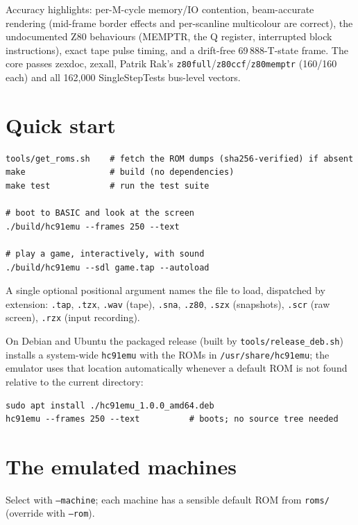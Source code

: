 \documentclass[11pt,a4paper]{article}
\newcommand{\opt}[1]{\texttt{#1}}
\begin{document}
Accuracy highlights: per-M-cycle memory/IO contention, beam-accurate
rendering (mid-frame border effects and per-scanline multicolour are
correct), the undocumented Z80 behaviours (MEMPTR, the Q register,
interrupted block instructions), exact tape pulse timing, and a
drift-free 69\,888-T-state frame. The core passes zexdoc, zexall,
Patrik Rak's \texttt{z80full}/\texttt{z80ccf}/\texttt{z80memptr}
(160/160 each) and all 162{,}000 SingleStepTests bus-level vectors.

\section{Quick start}

\begin{Verbatim}
tools/get_roms.sh    # fetch the ROM dumps (sha256-verified) if absent
make                 # build (no dependencies)
make test            # run the test suite

# boot to BASIC and look at the screen
./build/hc91emu --frames 250 --text

# play a game, interactively, with sound
./build/hc91emu --sdl game.tap --autoload
\end{Verbatim}

A single optional positional argument names the file to load,
dispatched by extension: \texttt{.tap}, \texttt{.tzx}, \texttt{.wav}
(tape),
\texttt{.sna}, \texttt{.z80}, \texttt{.szx} (snapshots),
\texttt{.scr} (raw screen), \texttt{.rzx} (input recording).

On Debian and Ubuntu the packaged release (built by
\texttt{tools/release\_deb.sh}) installs a system-wide
\texttt{hc91emu} with the ROMs in \texttt{/usr/share/hc91emu}; the
emulator uses that location automatically whenever a default ROM is
not found relative to the current directory:

\begin{Verbatim}
sudo apt install ./hc91emu_1.0.0_amd64.deb
hc91emu --frames 250 --text          # boots; no source tree needed
\end{Verbatim}

\section{The emulated machines}

Select with \opt{--machine}; each machine has a sensible default ROM
from \texttt{roms/} (override with \opt{--rom}).
\end{document}
